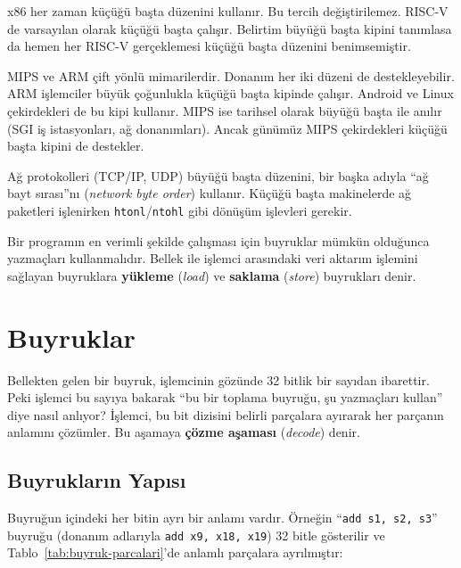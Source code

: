 \begin{karsilastirma}
x86 her zaman küçüğü başta düzenini kullanır. Bu tercih değiştirilemez. RISC-V de varsayılan olarak küçüğü başta çalışır. Belirtim büyüğü başta kipini tanımlasa da hemen her RISC-V gerçeklemesi küçüğü başta düzenini benimsemiştir.

MIPS ve ARM çift yönlü mimarilerdir. Donanım her iki düzeni de destekleyebilir. ARM işlemciler büyük çoğunlukla küçüğü başta kipinde çalışır. Android ve Linux çekirdekleri de bu kipi kullanır. MIPS ise tarihsel olarak büyüğü başta ile anılır (SGI iş istasyonları, ağ donanımları). Ancak günümüz MIPS çekirdekleri küçüğü başta kipini de destekler.

Ağ protokolleri (TCP/IP, UDP) büyüğü başta düzenini, bir başka adıyla ``ağ bayt sırası''nı (\emph{network byte order}) kullanır. Küçüğü başta makinelerde ağ paketleri işlenirken \texttt{htonl}/\texttt{ntohl} gibi dönüşüm işlevleri gerekir.
\end{karsilastirma}

Bir programın en verimli şekilde çalışması için buyruklar mümkün olduğunca yazmaçları kullanmalıdır. Bellek ile işlemci arasındaki veri aktarım işlemini sağlayan buyruklara \textbf{yükleme} (\emph{load}) ve \textbf{saklama} (\emph{store}) buyrukları denir.


\section{Buyruklar}
\label{sec:buyruklar}

Bellekten gelen bir buyruk, işlemcinin gözünde 32 bitlik bir sayıdan ibarettir. Peki işlemci bu sayıya bakarak ``bu bir toplama buyruğu, şu yazmaçları kullan'' diye nasıl anlıyor? İşlemci, bu bit dizisini belirli parçalara ayırarak her parçanın anlamını çözümler. Bu aşamaya \textbf{çözme aşaması} (\emph{decode}) denir.

\subsection{Buyrukların Yapısı}

Buyruğun içindeki her bitin ayrı bir anlamı vardır. Örneğin ``\texttt{add s1, s2, s3}'' buyruğu (donanım adlarıyla \texttt{add x9, x18, x19}) 32 bitle gösterilir ve Tablo~\ref{tab:buyruk-parcalari}'de anlamlı parçalara ayrılmıştır:

